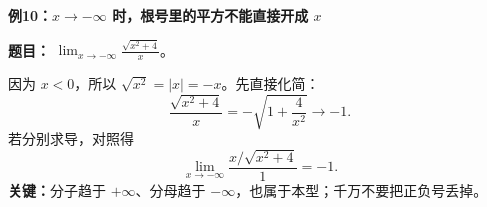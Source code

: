 \begin{examplebox}
\medskip
\textbf{\textcolor{CExample}{例10：$x\to-\infty$ 时，根号里的平方不能直接开成 $x$}}

\textbf{题目：} $\displaystyle\lim_{x\to-\infty}\frac{\sqrt{x^2+4}}{x}$。

因为 $x<0$，所以 $\sqrt{x^2}=|x|=-x$。先直接化简：
\[
\frac{\sqrt{x^2+4}}{x}
=-\sqrt{1+\frac4{x^2}}\longrightarrow\boxed{-1}.
\]
若分别求导，对照得
\[
\lim_{x\to-\infty}\frac{x/\sqrt{x^2+4}}{1}=-1.
\]
\textbf{关键：}分子趋于 $+\infty$、分母趋于 $-\infty$，也属于本型；千万不要把正负号丢掉。

\end{examplebox}
